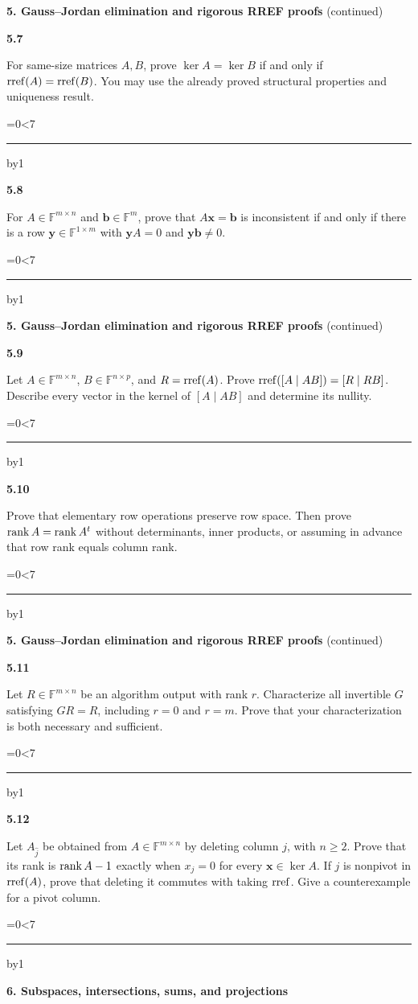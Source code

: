 \documentclass[11pt,letterpaper]{article}
\newcommand{\topicshort}{Problem collection}
\newcommand{\F}{\mathbb F}\newcommand{\R}{\mathbb R}\newcommand{\Q}{\mathbb Q}\newcommand{\C}{\mathbb C}\newcommand{\Z}{\mathbb Z}
\newcommand{\ruled}[1]{\par\begingroup\parskip=0pt\baselineskip=17pt\count255=0\loop\ifnum\count255<#1\noindent\textcolor{black!17}{\rule{\linewidth}{.25pt}}\par\advance\count255 by1\repeat\endgroup}
\newcommand{\problem}[4]{\noindent\begin{minipage}[t][3.48in][t]{\linewidth}\textbf{\color{navy}#1}\quad{\small\sffamily\color{teal}#2#3}\par #4\par\vfill\ruled{7}\end{minipage}}
\begin{document}
\newpage
\renewcommand{\topicshort}{Row reduction}
{\large\bfseries\color{navy}5. Gauss--Jordan elimination and rigorous RREF proofs} {\small(continued)}\par\vspace{9pt}
\problem{5.7}{M}{}{For same-size matrices $A,B$, prove $\ker A=\ker B$ if and only if $\operatorname{rref}(A)=\operatorname{rref}(B)$. You may use the already proved structural properties and uniqueness result.}
\par\vspace{14pt}
\problem{5.8}{M}{}{For $A\in\F^{m\times n}$ and $\mathbf b\in\F^m$, prove that $A\mathbf x=\mathbf b$ is inconsistent if and only if there is a row $\mathbf y\in\F^{1\times m}$ with $\mathbf yA=0$ and $\mathbf y\mathbf b\ne0$.}
\newpage
\renewcommand{\topicshort}{Row reduction}
{\large\bfseries\color{navy}5. Gauss--Jordan elimination and rigorous RREF proofs} {\small(continued)}\par\vspace{9pt}
\problem{5.9}{M}{}{Let $A\in\F^{m\times n}$, $B\in\F^{n\times p}$, and $R=\operatorname{rref}(A)$. Prove $\operatorname{rref}([A\mid AB])=[R\mid RB]$. Describe every vector in the kernel of $[A\mid AB]$ and determine its nullity.}
\par\vspace{14pt}
\problem{5.10}{M}{ / $\star$}{Prove that elementary row operations preserve row space. Then prove $\operatorname{rank} A=\operatorname{rank} A^t$ without determinants, inner products, or assuming in advance that row rank equals column rank.}
\newpage
\renewcommand{\topicshort}{Row reduction}
{\large\bfseries\color{navy}5. Gauss--Jordan elimination and rigorous RREF proofs} {\small(continued)}\par\vspace{9pt}
\problem{5.11}{C}{}{Let $R\in\F^{m\times n}$ be an algorithm output with rank $r$. Characterize all invertible $G$ satisfying $GR=R$, including $r=0$ and $r=m$. Prove that your characterization is both necessary and sufficient.}
\par\vspace{14pt}
\problem{5.12}{C}{}{Let $A_{\widehat j}$ be obtained from $A\in\F^{m\times n}$ by deleting column $j$, with $n\ge2$. Prove that its rank is $\operatorname{rank} A-1$ exactly when $x_j=0$ for every $\mathbf x\in\ker A$. If $j$ is nonpivot in $\operatorname{rref}(A)$, prove that deleting it commutes with taking $\operatorname{rref}$. Give a counterexample for a pivot column.}
\newpage
\renewcommand{\topicshort}{Subspaces and sums}
{\large\bfseries\color{navy}6. Subspaces, intersections, sums, and projections}\par\vspace{9pt}
\end{document}
